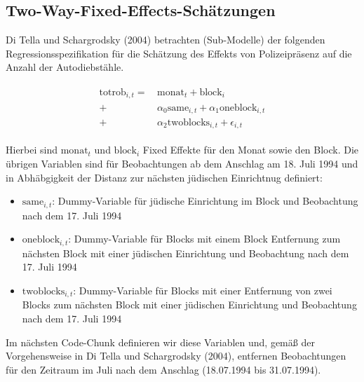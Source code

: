 \documentclass[
  a4paper,
  DIV=11,
  oneside]{scrreprt}
\begin{document}
\subsection{Two-Way-Fixed-Effects-Schätzungen}\label{two-way-fixed-effects-schuxe4tzungen}

Di Tella und Schargrodsky (2004) betrachten (Sub-Modelle) der folgenden
Regressionsspezifikation für die Schätzung des Effekts von
Polizeipräsenz auf die Anzahl der Autodiebstähle.

\begin{align}
  \begin{split}
  \text{totrob}_{i,t} =&\, \text{monat}_t + \text{block}_i \\
  + &\, \alpha_0 \text{same}_{i,t} + \alpha_1 \text{oneblock}_{i,t} \\
  + &\, \alpha_2 \text{twoblocks}_{i,t} + \epsilon_{i,t}
  \end{split}\label{eq:ppbase}
\end{align}

Hierbei sind \(\text{monat}_t\) und \(\text{block}_i\) Fixed Effekte für
den Monat sowie den Block. Die übrigen Variablen sind für Beobachtungen
ab dem Anschlag am 18. Juli 1994 und in Abhäbgigkeit der Distanz zur
nächsten jüdischen Einrichtnug definiert:

\begin{itemize}
\item
  \(\text{same}_{i,t}\): Dummy-Variable für jüdische Einrichtung im
  Block und Beobachtung nach dem 17. Juli 1994
\item
  \(\text{oneblock}_{i,t}\): Dummy-Variable für Blocks mit einem Block
  Entfernung zum nächsten Block mit einer jüdischen Einrichtung und
  Beobachtung nach dem 17. Juli 1994
\item
  \(\text{twoblocks}_{i,t}\): Dummy-Variable für Blocks mit einer
  Entfernung von zwei Blocks zum nächsten Block mit einer jüdischen
  Einrichtung und Beobachtung nach dem 17. Juli 1994
\end{itemize}

Im nächsten Code-Chunk definieren wir diese Variablen und, gemäß der
Vorgehensweise in Di Tella und Schargrodsky (2004), entfernen
Beobachtungen für den Zeitraum im Juli nach dem Anschlag (18.07.1994 bis
31.07.1994).
\end{document}
